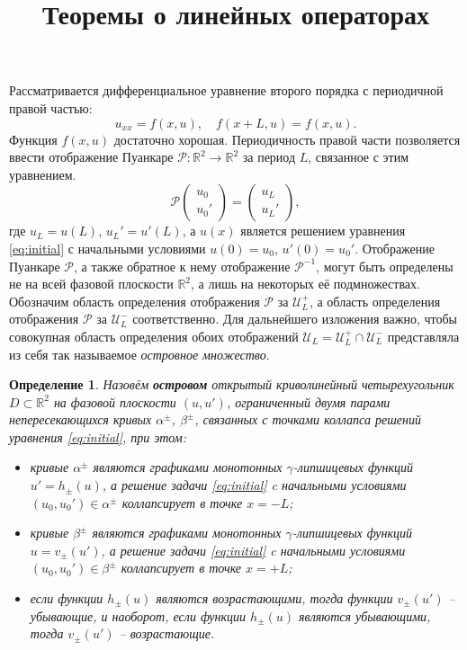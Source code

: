 \documentclass{article}
\newtheorem*{definition}{Определение}
\begin{document}
\title{Теоремы о линейных операторах}

\maketitle

Рассматривается дифференциальное уравнение второго порядка с периодичной правой частью:
\begin{equation}
	u_{xx} = f(x, u), \quad f(x + L, u) = f(x, u).
\label{eq:initial}
\end{equation}
Функция $f(x, u)$ достаточно хорошая.
Периодичность правой части позволяется ввести отображение Пуанкаре $\mathcal{P}: \mathbb{R}^2 \to \mathbb{R}^2$ за период $L$, связанное с этим уравнением.
\begin{equation}
	\mathcal{P} \begin{pmatrix} u_0 \\ u_0' \end{pmatrix}
	= \begin{pmatrix} u_L \\ u_L' \end{pmatrix},
\end{equation}
где $u_L = u(L)$, $u_L' = u'(L)$, а $u(x)$ является решением уравнения \eqref{eq:initial} с начальными условиями $u(0) = u_0$, $u'(0) = u_0'$.
Отображение Пуанкаре $\mathcal{P}$, а также обратное к нему отображение $\mathcal{P}^{-1}$, могут быть определены не на всей фазовой плоскости $\mathbb{R}^2$, а лишь на некоторых её подмножествах.
Обозначим область определения отображения $\mathcal{P}$ за $\mathcal{U}_L^+$, а область определения отображения $\mathcal{P}$ за $\mathcal{U}_L^-$ соответственно.
Для дальнейшего изложения важно, чтобы совокупная область определения обоих отображений $\mathcal{U}_L = \mathcal{U}_L^+ \cap \mathcal{U}_L^-$ представляла из себя так называемое {\it островное множество}.

\begin{definition}
	Назовём {\bf островом} открытый криволинейный четырехугольник $D \subset \mathbb{R}^2$ на фазовой плоскости $(u, u')$, ограниченный двумя парами непересекающихся кривых $\alpha^{\pm}$, $\beta^{\pm}$, связанных с точками коллапса решений уравнения \eqref{eq:initial}, при этом:
	\begin{itemize}
		\item кривые $\alpha^{\pm}$ являются графиками монотонных $\gamma$-липшицевых функций $u' = h_{\pm}(u)$, а решение задачи \eqref{eq:initial} c начальными условиями $(u_0, u_0') \in \alpha^{\pm}$ коллапсирует в точке $x = -L$;
		\item кривые $\beta^{\pm}$ являются графиками монотонных $\gamma$-липшицевых функций $u = v_{\pm}(u')$, а решение задачи \eqref{eq:initial} c начальными условиями $(u_0, u_0') \in \beta^{\pm}$ коллапсирует в точке $x = +L$;
		\item если функции $h_{\pm}(u)$ являются возрастающими, тогда функции $v_{\pm}(u')$ -- убывающие, и наоборот, если функции $h_{\pm}(u)$ являются убывающими, тогда $v_{\pm}(u')$ -- возрастающие.
	\end{itemize}
\end{definition}
\end{document}
